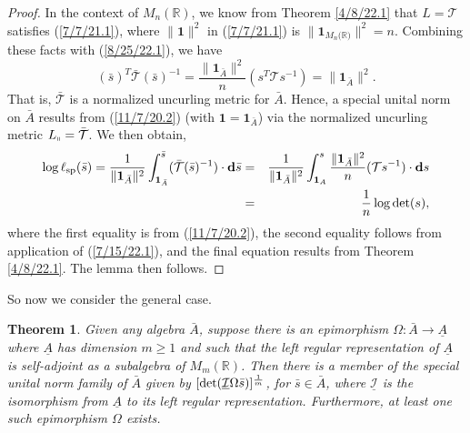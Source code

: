 \documentclass{amsart}
\numberwithin{equation}{section}
\newtheorem{theorem}{Theorem}
\theoremstyle{definition}
\numberwithin{theorem}{section}
\begin{document}
\begin{proof}
In the context of $M_n(\mathbb{R})$, we know from Theorem \ref{4/8/22.1} that $L=\mathcal{T}$ satisfies (\ref{7/7/21.1}), where $\|\mathbf{1}\|^2$ in  (\ref{7/7/21.1}) is $\|\mathbf{1}_{M_n({\mathbb{R})}}\|^2 = n$.  Combining these facts with (\ref{8/25/22.1}), we have \begin{equation}\label{9/27/23.1} (\bar{s})^T \bar{\mathcal{T}} (\bar{s})^{-1} = \frac{\|\mathbf{1}_{\bar{A}}\|^2}{n}( s^T \mathcal{T} s^{-1}) = \|\mathbf{1}_{\bar{A}}\|^2 .\end{equation} 
That is, $\mathcal{\bar{T}}$ is a normalized uncurling metric for $\bar{A}$.  Hence, a special unital norm on $\bar{A}$ results from (\ref{11/7/20.2}) (with $\mathbf{1}=\mathbf{1}_{\bar{A}}$)  via the normalized uncurling metric $L_{\shortparallel} = \bar{\mathcal{T}}$.  
  We then obtain, 
\begin{eqnarray}\nonumber \log\ell_{\rm sp}(\bar{s}) = \frac{1}{\|\mathbf{1}_{\bar{A}}\|^2} \int_{\mathbf{1}_{\bar{A}}}^{\bar{s}} (\bar{\mathcal{T}}(\bar{s})^{-1})\cdot \mathbf{d}\bar{s}
 &=& \frac{1}{\|\mathbf{1}_{\bar{A}}\|^2} \int_{\mathbf{1}_{A}}^{s} \frac{\|\mathbf{1}_{\bar{A}}\|^2}{n}(\mathcal{T}s^{-1})\cdot \mathbf{d}s \\ &=& \frac{1}{n} \log\text{det}(s),\label{9/27/23.2}\end{eqnarray} where the first equality is from (\ref{11/7/20.2}), the second equality follows from application of (\ref{7/15/22.1}), and the final equation results from Theorem \ref{4/8/22.1}.
The lemma then follows. 
 \end{proof} 
 

So now we consider the general case.
 
  \begin{theorem}\label{11/17/22.1}
  Given any algebra $\bar{A}$, suppose there is an epimorphism $\Omega:\bar{A}\rightarrow \underline{A}$ where $ \underline{A}$ has dimension $m\ge 1$ and such that the left regular representation of $\underline{A}$ is self-adjoint as a subalgebra of $M_m(\mathbb{R})$.  Then there is a member of the special unital norm family of  $\bar{A}$ given by $[{\rm det}(\underline{\mathcal{I}}\Omega \bar{s})]^{\frac{1}{m}}$, for $\bar{s}\in\bar{A}$, where $\underline{\mathcal{I}}$ is the isomorphism from $\underline{A}$ to its left regular representation.  Furthermore, at least one such epimorphism $\Omega$ exists. 
   \end{theorem}
 
\end{document}
